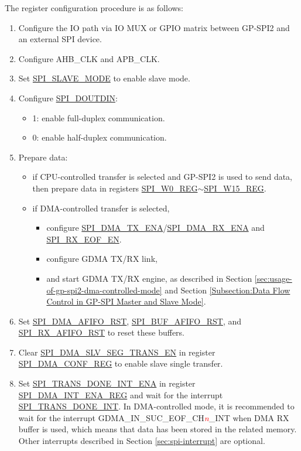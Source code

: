\documentclass[main\_\_EN.tex]{subfiles}
\begin{document}
The register configuration procedure is as follows:
\begin{enumerate}
    \item Configure the IO path via IO MUX or GPIO matrix between GP-SPI2 and an external SPI device.
    \item Configure AHB\_CLK and APB\_CLK.
    \item Set \hyperref[fielddesc:SPISLAVEMODE]{SPI\_SLAVE\_MODE} to enable slave mode.
    \item Configure \hyperref[fielddesc:SPIDOUTDIN]{SPI\_DOUTDIN}:
    \begin{itemize}
        \item 1: enable full-duplex communication.
        \item 0: enable half-duplex communication.
    \end{itemize}
    \item Prepare data:
    \begin{itemize}
        \item if CPU-controlled transfer is selected and GP-SPI2 is used to send data, then prepare data in registers \hyperref[regdesc:SPIW0REG]{SPI\_W0\_REG}$\sim$\hyperref[regdesc:SPIW15REG]{SPI\_W15\_REG}.
        \item if DMA-controlled transfer is selected,
        \begin{itemize}
            \item configure \hyperref[fielddesc:SPIDMATXENA]{SPI\_DMA\_TX\_ENA}/\hyperref[fielddesc:SPIDMARXENA]{SPI\_DMA\_RX\_ENA} and \hyperref[fielddesc:SPIRXEOFEN]{SPI\_RX\_EOF\_EN}.
            \item configure GDMA TX/RX link,
            \item and start GDMA TX/RX engine, as described in Section \ref{sec:usage-of-gp-spi2-dma-controlled-mode} and Section \ref{Subsection:Data Flow Control in GP-SPI Master and Slave Mode}.
        \end{itemize}
    \end{itemize}
    \item Set \hyperref[fielddesc:SPIDMAAFIFORST]{SPI\_DMA\_AFIFO\_RST}, \hyperref[fielddesc:SPIBUFAFIFORST]{SPI\_BUF\_AFIFO\_RST}, and \hyperref[fielddesc:SPIRXAFIFORST]{SPI\_RX\_AFIFO\_RST} to reset these buffers.
    \item Clear \hyperref[fielddesc:SPIDMASLVSEGTRANSEN]{SPI\_DMA\_SLV\_SEG\_TRANS\_EN} in register \hyperref[regdesc:SPIDMACONFREG]{SPI\_DMA\_CONF\_REG} to enable slave single transfer.
    \item Set \hyperref[fielddesc:SPITRANSDONEINTENA]{SPI\_TRANS\_DONE\_INT\_ENA} in register \hyperref[regdesc:SPIDMAINTENAREG]{SPI\_DMA\_INT\_ENA\_REG} and wait for the interrupt \hyperref[int:SPITRANSDONEINT]{SPI\_TRANS\_DONE\_INT}. In DMA-controlled mode, it is recommended to wait for the interrupt GDMA\_IN\_SUC\_EOF\_CH\textcolor{red}{\it{n}}\_INT when DMA RX buffer is used, which means that data has been stored in the related memory. Other interrupts described in Section \ref{sec:spi-interrupt} are optional.
\end{enumerate}
\end{document}
